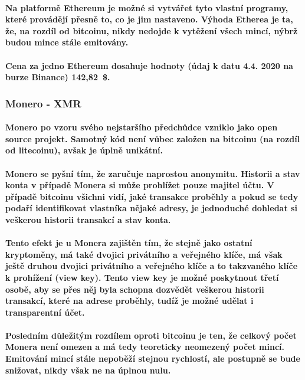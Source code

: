 \documentclass[thesis=B,czech]{FITthesis}[2019/03/21]
\begin{document}
\paragraph{
Na platformě Ethereum je možné si vytvářet tyto vlastní programy, které provádějí přesně to, co je jim nastaveno. \cite{ethereum} Výhoda Etherea je ta, že, na rozdíl od bitcoinu, nikdy nedojde k vytěžení všech mincí, nýbrž budou mince stále emitovány. \cite{alza_monero}
}
\paragraph{
Cena za jedno Ethereum dosahuje hodnoty (údaj k datu 4.4. 2020 na burze Binance) 142,82~\$. \cite{binance_markets}
}
\subsubsection{Monero - XMR}
\paragraph{
Monero po vzoru svého nejstaršího předchůdce vzniklo jako open source projekt. Samotný kód není vůbec založen na bitcoinu (na rozdíl od litecoinu), avšak je úplně unikátní. 
}
\paragraph{
Monero se pyšní tím, že zaručuje naprostou anonymitu. Historii a stav konta v případě Monera si může prohlížet pouze majitel účtu. V případě bitcoinu všichni vidí, jaké transakce proběhly a pokud se tedy podaří identifikovat vlastníka nějaké adresy, je jednoduché dohledat si veškerou historii transakcí a stav konta.
}
\paragraph{
Tento efekt je u Monera zajištěn tím, že stejně jako ostatní kryptoměny, má také dvojici privátního a veřejného klíče, má však ještě druhou dvojici privátního a veřejného klíče a to takzvaného klíče k prohížení (view key). Tento view key je možné poskytnout třetí osobě, aby se přes něj byla schopna dozvědět veškerou historii transakcí, které na adrese proběhly, tudíž je možné udělat i transparentní účet.
}
\paragraph{
Posledním důležitým rozdílem oproti bitcoinu je ten, že celkový počet Monera není omezen a má tedy teoreticky neomezený počet mincí. Emitování mincí stále nepoběží stejnou rychlostí, ale postupně se bude snižovat, nikdy však ne na úplnou nulu. \cite{alza_monero}
}
\end{document}
